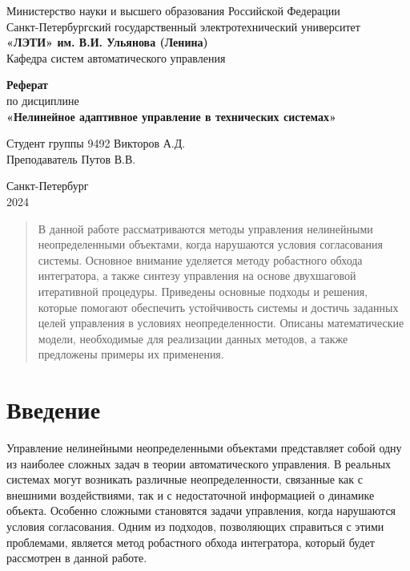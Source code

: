 \documentclass[a4paper,14pt]{extarticle} %
\begin{document}
\begin{titlepage}
    \begin{center}
        \large
        Министерство науки и высшего образования Российской Федерации \\
        Санкт-Петербургский государственный электротехнический университет \\
        \textbf{«ЛЭТИ» им. В.И. Ульянова (Ленина)} \\
        Кафедра систем автоматического управления

        \vfill

        \textbf{Реферат} \\
        по дисциплине \\
        \textbf{«Нелинейное адаптивное управление в технических системах»}

        \vfill

        Студент группы 9492 \hfill Викторов А.Д. \\
        Преподаватель \hfill Путов В.В.

        \vfill
        Санкт-Петербург \\
        2024
    \end{center}
\end{titlepage}

\setcounter{page}{2}
\tableofcontents

\newpage
\begin{abstract}
    В данной работе рассматриваются методы управления нелинейными неопределенными объектами, когда нарушаются условия согласования системы. Основное внимание уделяется методу робастного обхода интегратора, а также синтезу управления на основе двухшаговой итеративной процедуры. Приведены основные подходы и решения, которые помогают обеспечить устойчивость системы и достичь заданных целей управления в условиях неопределенности. Описаны математические модели, необходимые для реализации данных методов, а также предложены примеры их применения.
\end{abstract}

\newpage
\section{Введение}
Управление нелинейными неопределенными объектами представляет собой одну из наиболее сложных задач в теории автоматического управления. В реальных системах могут возникать различные неопределенности, связанные как с внешними воздействиями, так и с недостаточной информацией о динамике объекта. Особенно сложными становятся задачи управления, когда нарушаются условия согласования. Одним из подходов, позволяющих справиться с этими проблемами, является метод робастного обхода интегратора, который будет рассмотрен в данной работе.
\end{document}
